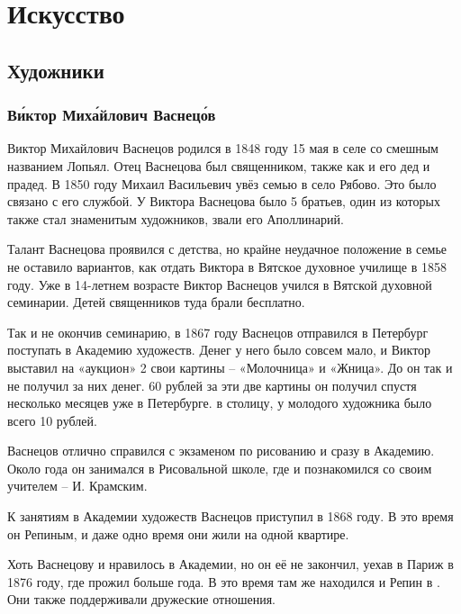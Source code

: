 \chapter{Искусство}

\section{Художники}
\subsection{В\'{и}ктор Мих\'{а}йлович Васнец\'{о}в}
Виктор Михайлович Васнецов родился в 1848 году 15 мая в селе со смешным названием Лопьял. Отец Васнецова был священником, также как и его дед и прадед. В 1850 году Михаил Васильевич увёз семью в село Рябово. Это было связано с его службой. У Виктора Васнецова было 5 братьев, один из которых также стал знаменитым художников, звали его Аполлинарий.

Талант Васнецова проявился с детства, но крайне неудачное  положение в семье не оставило вариантов, как отдать Виктора в Вятское духовное училище в 1858 году. Уже в 14-летнем возрасте Виктор Васнецов учился в Вятской духовной семинарии. Детей священников туда брали бесплатно.

Так и не окончив семинарию, в 1867 году Васнецов отправился в Петербург поступать в Академию художеств. Денег у него было совсем мало, и Виктор выставил на «аукцион» 2 свои картины -- «Молочница» и «Жница». До  он так и не получил за них денег. 60 рублей за эти две картины он получил спустя несколько месяцев уже в Петербурге.  в столицу, у молодого художника было всего 10 рублей.

Васнецов отлично справился с экзаменом по рисованию и сразу  в Академию. Около года он занимался в Рисовальной школе, где и познакомился со своим учителем -- И. Крамским.

К занятиям в Академии художеств Васнецов приступил в 1868 году. В это время он  Репиным, и даже одно время они жили на одной квартире.

Хоть Васнецову и нравилось в Академии, но он её не закончил, уехав в Париж в 1876 году, где прожил больше года. В это время там же находился и Репин в . Они также поддерживали дружеские отношения.

